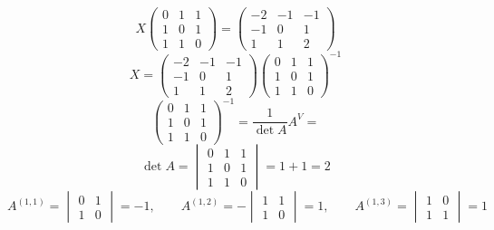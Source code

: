 \documentclass{article}
\theoremstyle{definition}
\theoremstyle{plain}
\begin{document}
\begin{equation*}
  X
  \begin{pmatrix}
    0 & 1 & 1\\
    1 & 0 & 1\\
    1 & 1 & 0
  \end{pmatrix}
  =
  \begin{pmatrix}
    -2 & -1 & -1\\
    -1 & 0 & 1\\
    1 & 1 & 2
  \end{pmatrix}
\end{equation*}
\begin{equation*}
  X
  =
  \begin{pmatrix}
    -2 & -1 & -1\\
    -1 & 0 & 1\\
    1 & 1 & 2
  \end{pmatrix}
  \begin{pmatrix}
    0 & 1 & 1\\
    1 & 0 & 1\\
    1 & 1 & 0
  \end{pmatrix}^{-1}
\end{equation*}
\begin{equation}\label{eq:1}
  \begin{pmatrix}
    0 & 1 & 1\\
    1 & 0 & 1\\
    1 & 1 & 0
  \end{pmatrix}^{-1}
  =
  \frac{1}{\det A}A^{V} =
\end{equation}
\begin{equation*}
  \det A =
  \begin{vmatrix}
    0 & 1 & 1\\
    1 & 0 & 1\\
    1 & 1 & 0
  \end{vmatrix}
  =
  1 + 1
  =
  2
\end{equation*}
\begin{equation*}
  A^{(1,1)}=
  \begin{vmatrix}
    0 & 1\\
    1 & 0
  \end{vmatrix}
  = -1
  , \qquad
  A^{(1, 2)} = -
  \begin{vmatrix}
    1 & 1\\
    1 & 0
  \end{vmatrix}
  = 1, \qquad
  A^{(1, 3)} =
  \begin{vmatrix}
    1 & 0\\
    1 & 1
  \end{vmatrix}
  = 1
\end{equation*}
\end{document}
